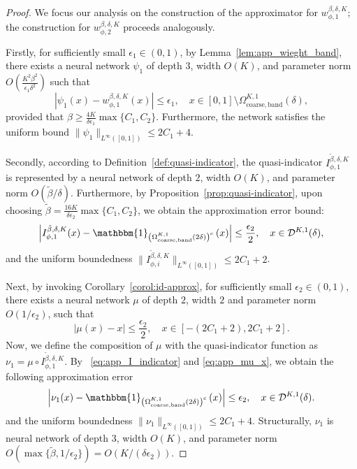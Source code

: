 \documentclass[11pt]{article}
\begin{document}
\begin{proof}
   We focus our analysis on the construction of the approximator for $w_{\phi,1}^{\beta, \delta, K}$; the construction for $w_{\phi,2}^{\beta, \delta, K}$ proceeds analogously.


    Firstly, for sufficiently small $\epsilon_1 \in (0,1)$, by Lemma~\ref{lem:app_wieght_band},  there exists a neural network $\psi_1$ of depth $3$, width $O(K)$, and parameter norm $O(\frac{K^2 \beta^2}{\epsilon_1 \delta^2})$ such that 
    \begin{equation}
        |\psi_1(x) - w_{\phi,1}^{\beta, \delta, K}(x) | \leq \epsilon_1, \quad x \in [0,1] \setminus \Omega_{\mathrm{coarse, band}}^{K,1}(\delta),
        \label{eq:app_psi1_univariate_weight}
    \end{equation}
    provided that $\beta \geq \frac{4K}{\delta \epsilon_1} \max \{C_1, C_2\}$. Furthermore, the network satisfies the uniform bound $\|\psi_1\|_{L^{\infty}([0,1])} \leq 2C_1+4$.


    Secondly, according to Definition~\ref{def:quasi-indicator}, the quasi-indicator $I_{\phi,1}^{\tilde{\beta}, {\delta}, K}$ is represented by a neural network of depth $2$, width $O(K)$, and parameter norm $O({\tilde{\beta}}/{{\delta}})$. Furthermore, by Proposition~\ref{prop:quasi-indicator}, upon choosing $\tilde{\beta} = \frac{16K}{\delta \epsilon_2} \max \{C_1, C_2\}$, we obtain the approximation error bound:
     \begin{equation}
       \left| I_{\phi,1}^{\tilde{\beta},{\delta},K} (x)- \mathbbm{1}_{\left(\Omega_{\mathrm{coarse,band}}^{K,1}(2 \delta)\right)^c} \left( x \right) \right| \leq \frac{\epsilon_2}{2}, \quad x \in \mathcal{D}^{K,1}(\delta),
       \label{eq:app_I_indicator}
    \end{equation}
    and the uniform boundedness $\|I_{\phi,i}^{\tilde{\beta},{\delta},K}\|_{L^{\infty}([0,1])} \leq 2C_1 + 2$. 


    Next, by invoking Corollary~\ref{corol:id-approx}, for sufficiently small $\epsilon_2 \in (0,1)$, there exists a neural network $\mu$ of depth $2$, width $2$ and parameter norm $O({1}/{\epsilon_2})$, such that
    \begin{equation}
        |\mu(x) - x| \leq \frac{\epsilon_2}{2}, \quad x \in [-(2C_1 + 2), 2C_1+2].
        \label{eq:app_mu_x}
    \end{equation}
    Now, we define the composition of $\mu$ with the quasi-indicator function as $\nu_1 = \mu \circ I_{\phi,1}^{\tilde{\beta}, \delta, K}$. By ~\eqref{eq:app_I_indicator} and \eqref{eq:app_mu_x}, we obtain the following approximation error
    \begin{equation}
        \left|\nu_1(x) -  \mathbbm{1}_{\left(\Omega_{\mathrm{coarse,band}}^{K,1}(2 \delta)\right)^c} \left( x \right) \right| \leq \epsilon_2, \quad x \in \mathcal{D}^{K,1}(\delta).
        \label{eq:app_nu1_coarse_band}
    \end{equation}
    and the uniform boundedness $\|\nu_1\|_{L^{\infty}([0,1])} \leq 2 C_1 + 4$. Structurally, $\nu_1$ is neural network of depth $3$, width $O(K)$, and parameter norm $O(\max\{\tilde{\beta}, 1/ \epsilon_2\}) = O(K / (\delta \epsilon_2))$.



\end{proof}
\end{document}
